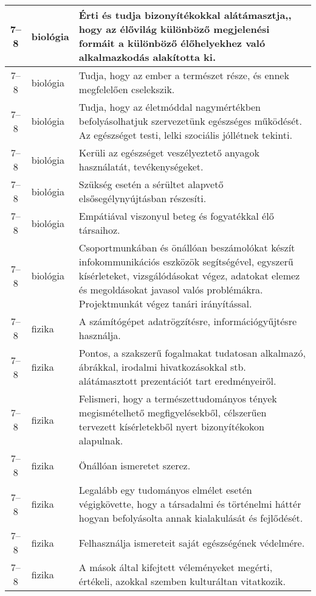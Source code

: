 \begin{small}
\begin{longtable}{c | p{2cm} |  p{11cm} }
              7--8 & biológia & Érti és tudja bizonyítékokkal alátámasztja,, hogy az élővilág különböző megjelenési formáit a különböző élőhelyekhez való alkalmazkodás alakította ki. \\ \hline
              7--8 & biológia & Tudja, hogy az ember a természet része, és ennek megfelelően cselekszik. \\ \hline
              7--8 & biológia & Tudja, hogy az életmóddal nagymértékben befolyásolhatjuk szervezetünk egészséges működését. Az egészséget testi, lelki szociális jóllétnek tekinti. \\ \hline
              7--8 & biológia & Kerüli az egészséget veszélyeztető anyagok használatát, tevékenységeket. \\ \hline
              7--8 & biológia & Szükség esetén a sérültet alapvető elsősegélynyújtásban részesíti. \\ \hline
              7--8 & biológia & Empátiával viszonyul beteg és fogyatékkal élő társaihoz. \\ \hline
              7--8 & biológia & Csoportmunkában és önállóan beszámolókat készít infokommunikációs eszközök segítségével, egyszerű kísérleteket, vizsgálódásokat végez, adatokat elemez és megoldásokat javasol valós problémákra. Projektmunkát végez tanári irányítással. \\ \hline
              7--8 & fizika & A számítógépet adatrögzítésre, információgyűjtésre használja. \\ \hline
              7--8 & fizika & Pontos, a szakszerű fogalmakat tudatosan alkalmazó, ábrákkal, irodalmi hivatkozásokkal stb. alátámasztott prezentációt tart eredményeiről. \\ \hline
              7--8 & fizika & Felismeri, hogy a természettudományos tények megismételhető megfigyelésekből, célszerűen tervezett kísérletekből nyert bizonyítékokon alapulnak. \\ \hline
              7--8 & fizika & Önállóan ismeretet szerez. \\ \hline
              7--8 & fizika & Legalább egy tudományos elmélet esetén végigkövette, hogy a társadalmi és történelmi háttér hogyan befolyásolta annak kialakulását és fejlődését. \\ \hline
              7--8 & fizika & Felhasználja ismereteit saját egészségének védelmére. \\ \hline
              7--8 & fizika & A mások által kifejtett véleményeket megérti, értékeli, azokkal szemben kulturáltan vitatkozik. \\ \hline

\end{longtable}
\end{small}
